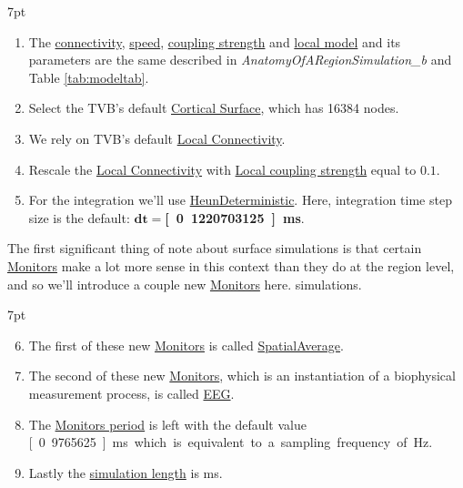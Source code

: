 \documentclass{tufte-handout}
\newenvironment{simulation}{%
  \def\FrameCommand{%
    \hspace{1pt}%
    {\color{ForestGreen}\vrule width 2pt}%
    {\color{simulationshade}\vrule width 4pt}%
    \colorbox{simulationshade}%
  }%
  \MakeFramed{\advance\hsize-\width\FrameRestore}%
  \noindent\hspace{-4.55pt}%
  \begin{adjustwidth}{}{7pt}%
  \vspace{2pt}\vspace{2pt}%
}
{%
  \vspace{2pt}\end{adjustwidth}\endMakeFramed%
}
\begin{document}
\begin{simulation}
\begin{enumerate}
\item The \underline{connectivity}, \underline{speed}, \underline{coupling strength} and \underline{local model} and its parameters are the same described in  \textit{AnatomyOfARegionSimulation\_b} and Table \ref{tab:modeltab}.
\item Select the TVB's default \underline{Cortical Surface}, which has 16384 nodes. 
\item We rely on TVB's default \underline{Local Connectivity}.
\item Rescale the \underline{Local Connectivity} with \underline{Local coupling strength} equal to $\mathbf{0.1}$.
\item For the integration we'll use \underline{HeunDeterministic}.  Here, integration time step size is the default: $\mathbf{dt=}$\textbf{\unit[0.1220703125]{ms}}.
\end{enumerate}
\end{simulation}

The first significant thing of note about surface simulations is that certain \underline{Monitors} make a lot more sense in this context than they do at the region level, and so we'll introduce a couple new \underline{Monitors} here.
simulations.

\begin{simulation}
\begin{enumerate}[resume]
\setcounter{enumi}{5}
\item The first of these new \underline{Monitors} is called
\underline{SpatialAverage}.
\item The second of these new \underline{Monitors}, which is an instantiation of a
biophysical measurement process, is called \underline{EEG}. 
\item The \underline{Monitors period} is left with the default value \unit[0.9765625]{ms} which is equivalent to a sampling frequency of \unit[512]{Hz}.
\item Lastly the \underline{simulation length} is \unit[2000]{ms}.
\end{enumerate}
\end{simulation}
\end{document}
